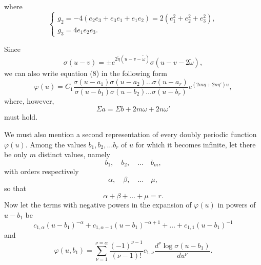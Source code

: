 \documentclass[12pt]{article}
\begin{document}

where
\begin{equation}
\begin{cases}
g_2 = -4(e_2e_3 + e_3e_1 + e_1e_2) = 2(e_1^2 + e_2^2 + e_3^2),\\
g_3 = 4e_1e_2e_3.
\end{cases}
\end{equation}

Since
\begin{equation*}
\sigma(u-v) = \pm e^{2\tilde{\eta}(u-v-\tilde{\omega})} \sigma(u-v-2\tilde{\omega}),
\end{equation*}
we can also write equation (8) in the following form
\begin{equation}
\tag{8$^a$.} \varphi(u) = C_1 \frac{\sigma(u-a_1)\sigma(u-a_2)\dots\sigma(u-a_r)}{\sigma(u-b_1)\sigma(u-b_2)\dots\sigma(u-b_r)} e^{(2m\eta+2n\eta')u},
\end{equation}
where, however,
\begin{equation*}
\Sigma a = \Sigma b + 2m\omega + 2n\omega'
\end{equation*}
must hold.

We must also mention a second representation of every doubly periodic function $\varphi(u)$. Among the values $b_1, b_2, \dots b_r$ of $u$ for which it becomes infinite, let there be only $m$ distinct values, namely
\begin{equation*}
b_1, \quad b_2, \quad \dots \quad b_m,
\end{equation*}
with orders respectively
\begin{equation*}
\alpha, \quad \beta, \quad \dots \quad \mu,
\end{equation*}
so that
\begin{equation*}
\alpha + \beta + \dots + \mu = r.
\end{equation*}
Now let the terms with negative powers in the expansion of $\varphi(u)$ in powers of $u-b_1$ be
\begin{equation*}
c_{1,\alpha}(u-b_1)^{-\alpha} + c_{1,\alpha-1}(u-b_1)^{-\alpha+1} + \dots + c_{1,1}(u-b_1)^{-1}
\end{equation*}
and
\begin{equation}
\varphi(u,b_1) = \sum_{\nu=1}^{\nu=\alpha} \frac{(-1)^{\nu-1}}{(\nu-1)!} c_{1,\nu} \frac{d^\nu \log\sigma(u-b_1)}{du^\nu}.
\end{equation}
\end{document}
